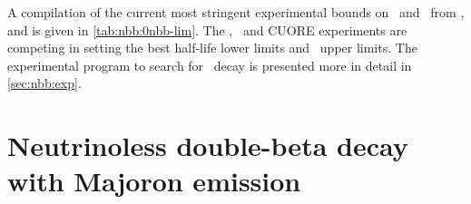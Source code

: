 A compilation of the current most stringent experimental bounds on \thalfzero\ and \mbb\
from \gesix,  and  is given in \cref{tab:nbb:0nbb-lim}. The
\gerda, \kamlandzen\ and CUORE experiments are competing in setting the best half-life
lower limits and \mbb\ upper limits. The experimental program to search for \onbb\ decay
is presented more in detail in \cref{sec:nbb:exp}.

\begin{table}
  \centering
  \caption{%
    Compilation of current most stringent 90\% C.L.~experimental bounds on
    \thalfzero\ and \mbb\ from \gesix, $^{130}$Te and $^{136}$Xe experiments. A
    value of $g_A \simeq 1.27$ is used.
  }\label{tab:nbb:0nbb-lim}
  
\end{table}

\section{Neutrinoless double-beta decay with Majoron emission}%
\label{sec:nbb:0nbbx}

